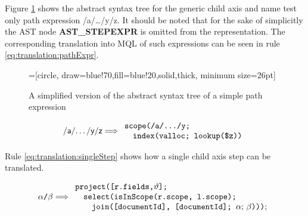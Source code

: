 Figure \ref{fig:translation:pathAST} shows the abstract syntax tree for the
generic child axis and name test only path expression \textsf{/a/\ldots/y/z}. It
should be noted that for the sake of simplicitly the AST node \textbf{AST\_STEPEXPR} is
omitted from the representation. The corresponding translation into MQL of such
expressions can be seen in rule \ref{eq:translation:pathExpr}.


\begin{figure}[h]
\centering
{}=[circle, draw=blue!70,fill=blue!20,solid,thick, minimum
size=26pt]
\label{fig:translation:pathAST}
\caption[AST of path expression]{A simplified version of the abstract syntax
tree of a simple path expression}
\end{figure}


\begin{equation}
\centering
\textsf{/a/\ldots/y/z}
\Longrightarrow
\begin{array}{l}
	\mbox{\texttt{scope(/a/\ldots/y;}} \\
	\quad \mbox{\texttt{index(valloc; lookup(\$z))}}
\end{array}
\label{eq:translation:pathExpr}
\end{equation}

Rule \ref{eq:translation:singleStep} shows how a single child axis step can be
translated.

\begin{equation}
\centering
\alpha \texttt{/} \beta
\Longrightarrow
\begin{array}{l}
	\mbox{\texttt{project([r.fields,}} \vartheta \mbox{\texttt{];}} \\ \quad
 	\mbox{\texttt{select(isInScope(r.scope, l.scope);}} \\ \quad \quad
 	\mbox{\texttt{join([documentId], [documentId]; }} 
 	\alpha;\, \beta \mbox{\texttt{)))}}; \\
\end{array}
\label{eq:translation:singleStep}
\end{equation}

